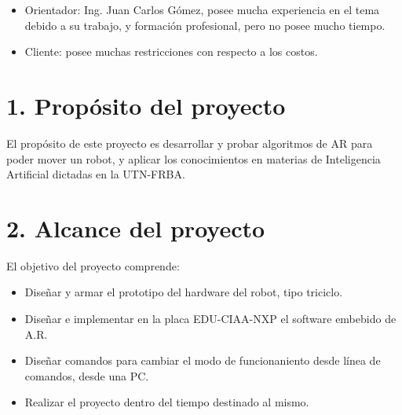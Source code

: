 \documentclass[11pt]{charter}
\begin{document}
\begin{itemize}
\item Orientador: Ing. Juan Carlos Gómez, posee mucha experiencia en el tema debido a su trabajo, y formación  profesional, pero no posee mucho tiempo.
\item Cliente: posee muchas restricciones con respecto a los costos.
\end{itemize}

\section{1. Propósito del proyecto}
\label{sec:proposito}


El propósito de este proyecto es desarrollar y probar  algoritmos de AR para poder mover un robot, y aplicar los conocimientos en materias de Inteligencia Artificial  dictadas en la UTN-FRBA.



\section{2. Alcance del proyecto}
\label{sec:alcance}

 
El objetivo del proyecto comprende:

\begin{itemize}
\item Diseñar y armar el prototipo del hardware del robot, tipo triciclo.
\item Diseñar e implementar en la placa EDU-CIAA-NXP el software embebido de A.R.
\item Diseñar comandos para cambiar el modo de funcionaniento desde línea de comandos, desde una PC. 
\item Realizar el proyecto dentro del tiempo destinado al mismo.
\end{itemize}
\end{document}
